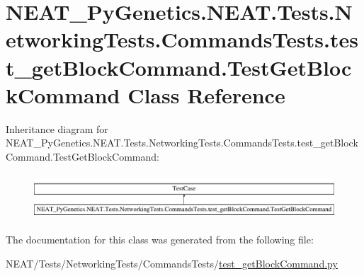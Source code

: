 \hypertarget{classNEAT__PyGenetics_1_1NEAT_1_1Tests_1_1NetworkingTests_1_1CommandsTests_1_1test__getBlockCommand_1_1TestGetBlockCommand}{}\section{N\+E\+A\+T\+\_\+\+Py\+Genetics.\+N\+E\+A\+T.\+Tests.\+Networking\+Tests.\+Commands\+Tests.\+test\+\_\+get\+Block\+Command.\+Test\+Get\+Block\+Command Class Reference}
\label{classNEAT__PyGenetics_1_1NEAT_1_1Tests_1_1NetworkingTests_1_1CommandsTests_1_1test__getBlockCommand_1_1TestGetBlockCommand}
Inheritance diagram for N\+E\+A\+T\+\_\+\+Py\+Genetics.\+N\+E\+A\+T.\+Tests.\+Networking\+Tests.\+Commands\+Tests.\+test\+\_\+get\+Block\+Command.\+Test\+Get\+Block\+Command\+:\begin{figure}[H]
\begin{center}
\leavevmode
\includegraphics[height=1.725732cm]{classNEAT__PyGenetics_1_1NEAT_1_1Tests_1_1NetworkingTests_1_1CommandsTests_1_1test__getBlockCommand_1_1TestGetBlockCommand}
\end{center}
\end{figure}


The documentation for this class was generated from the following file\+:\begin{DoxyCompactItemize}
\item 
N\+E\+A\+T/\+Tests/\+Networking\+Tests/\+Commands\+Tests/\hyperlink{test__getBlockCommand_8py}{test\+\_\+get\+Block\+Command.\+py}\end{DoxyCompactItemize}
